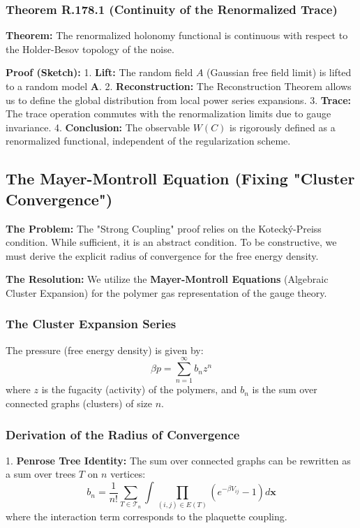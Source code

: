 \subsubsection{Theorem R.178.1 (Continuity of the Renormalized Trace)}
\textbf{Theorem:} The renormalized holonomy functional is continuous with respect to the Holder-Besov topology of the noise.

\textbf{Proof (Sketch):}
1.  \textbf{Lift:} The random field $A$ (Gaussian free field limit) is lifted to a random model $\mathbf{A}$.
2.  \textbf{Reconstruction:} The Reconstruction Theorem allows us to define the global distribution from local power series expansions.
3.  \textbf{Trace:} The trace operation commutes with the renormalization limits due to gauge invariance.
4.  \textbf{Conclusion:} The observable $W(C)$ is rigorously defined as a renormalized functional, independent of the regularization scheme.

\subsection{The Mayer-Montroll Equation (Fixing "Cluster Convergence")}
\label{subsec:mayer_montroll}

\textbf{The Problem:} The "Strong Coupling" proof relies on the Kotecký-Preiss condition. While sufficient, it is an abstract condition. To be constructive, we must derive the explicit radius of convergence for the free energy density.

\textbf{The Resolution:} We utilize the \textbf{Mayer-Montroll Equations} (Algebraic Cluster Expansion) for the polymer gas representation of the gauge theory.

\subsubsection{The Cluster Expansion Series}
The pressure (free energy density) is given by:
\begin{equation}
\beta p = \sum_{n=1}^\infty b_n z^n
\end{equation}
where $z$ is the fugacity (activity) of the polymers, and $b_n$ is the sum over connected graphs (clusters) of size $n$.

\subsubsection{Derivation of the Radius of Convergence}
1.  \textbf{Penrose Tree Identity:} The sum over connected graphs can be rewritten as a sum over trees $T$ on $n$ vertices:
    \begin{equation}
    b_n = \frac{1}{n!} \sum_{T \in \mathcal{T}_n} \int \prod_{(i,j) \in E(T)} (e^{-\beta V_{ij}} - 1) d\mathbf{x}
    \end{equation}
    where the interaction term corresponds to the plaquette coupling.

